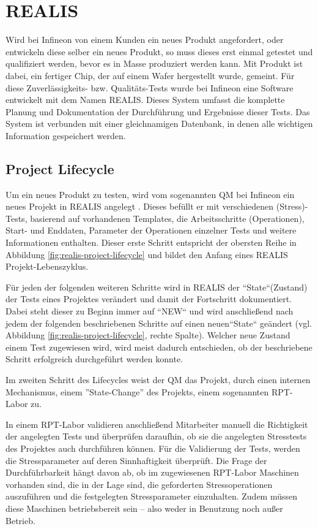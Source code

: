 \section{REALIS}\label{Sec:REALIS}
Wird bei Infineon von einem Kunden ein neues Produkt angefordert, oder entwickeln diese selber ein neues Produkt, so muss dieses erst einmal getestet und qualifiziert werden, bevor es in Masse produziert werden kann. Mit Produkt ist dabei, ein fertiger Chip, der auf einem Wafer hergestellt wurde, gemeint. Für diese Zuverlässigkeits- bzw. Qualitäts-Tests wurde bei Infineon eine Software entwickelt mit dem Namen \gls{REALIS}. Dieses System umfasst die komplette Planung und Dokumentation der Durchführung und Ergebnisse dieser Tests. Das System ist verbunden mit einer gleichnamigen Datenbank, in denen alle wichtigen Information gespeichert werden.

\subsection{Project Lifecycle}\label{Subsec:project-lifecycle}
Um ein neues Produkt zu testen, wird vom sogenannten \gls{QM} bei Infineon ein neues Projekt in \gls{REALIS} angelegt . Dieses befüllt er mit verschiedenen (Stress)-Tests, basierend auf vorhandenen Templates, die Arbeitsschritte (Operationen), Start- und Enddaten, Parameter der Operationen einzelner Tests und weitere Informationen enthalten. Dieser erste Schritt entspricht der obersten Reihe in Abbildung \ref{fig:realis-project-lifecycle} und bildet den Anfang eines REALIS Projekt-Lebenszyklus. 

Für jeden der folgenden weiteren Schritte wird in \gls{REALIS} der ``State``(Zustand) der Tests eines Projektes verändert und damit der Fortschritt dokumentiert. Dabei steht dieser zu Beginn immer auf  ``NEW`` und wird anschließend nach jedem der folgenden beschriebenen Schritte auf einen neuen``State`` geändert (vgl. Abbildung \ref{fig:realis-project-lifecycle}, rechte Spalte). Welcher neue Zustand einem Test zugewiesen wird, wird meist dadurch entschieden, ob der beschriebene Schritt erfolgreich durchgeführt werden konnte.

Im zweiten Schritt des Lifecycles weist der \gls{QM} das Projekt, durch einen internen Mechanismus, einem ''State-Change'' des Projekts, einem sogenannten  \gls{RPT}-Labor zu. 

In einem \gls{RPT}-Labor validieren anschließend Mitarbeiter manuell die Richtigkeit der angelegten Tests und überprüfen daraufhin, ob sie die angelegten Stresstests des Projektes auch durchführen können. 
Für die Validierung der Tests, werden die Stressparameter auf deren Sinnhaftigkeit überprüft. Die Frage der Durchführbarkeit hängt davon ab, ob im zugewiesenen \gls{RPT}-Labor Maschinen vorhanden sind, die in der Lage sind, die geforderten Stressoperationen auszuführen und die festgelegten Stressparameter einzuhalten. Zudem müssen diese Maschinen betriebsbereit sein – also weder in Benutzung noch außer Betrieb.

